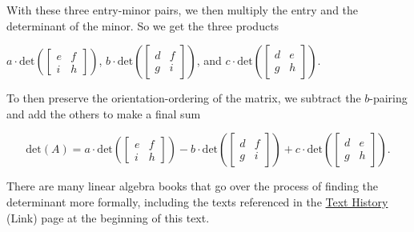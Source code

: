 \documentclass{ximera}
\begin{document}
With these three entry-minor pairs, we then multiply the entry and the determinant of the minor. So we get the three products

$a\cdot\mbox{det}\left(\begin{bmatrix}
    e&f\\i&h
\end{bmatrix}\right)$, $b\cdot \mbox{det}\left(\begin{bmatrix}
    d&f\\g&i
\end{bmatrix}\right)$, and $c\cdot \mbox{det}\left(\begin{bmatrix}
    d&e\\g&h
\end{bmatrix}\right)$.

To then preserve the orientation-ordering of the matrix, we subtract the $b$-pairing and add the others to make a final sum 

$$\mbox{det}(A)=a\cdot\mbox{det}\left(\begin{bmatrix}
    e&f\\i&h
\end{bmatrix}\right)-b\cdot \mbox{det}\left(\begin{bmatrix}
    d&f\\g&i
\end{bmatrix}\right)+c\cdot \mbox{det}\left(\begin{bmatrix}
    d&e\\g&h
\end{bmatrix}\right).$$

There are many linear algebra books that go over the process of finding the determinant more formally, including the texts referenced in the \href{https://ximera.osu.edu/appliedlinearalgebra/a1Copyright/learningActivities/m0Copyright/textHistory}{Text History} (Link) page at the beginning of this text.
\end{document}

